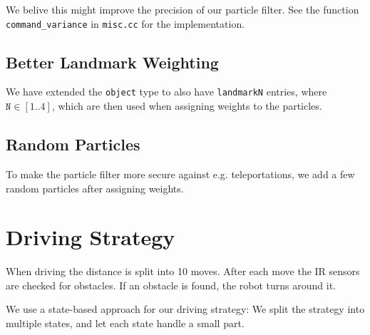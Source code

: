 \documentclass[a4paper,12pt]{article}
\begin{document}
We belive this might improve the precision of our particle filter.  See the
function \texttt{command_variance} in \texttt{misc.cc} for the implementation.


\subsection{Better Landmark Weighting}

We have extended the \texttt{object} type to also have \texttt{landmarkN}
entries, where $\texttt{N} \in [1..4]$, which are then used when assigning
weights to the particles.


\subsection{Random Particles}

To make the particle filter more secure against e.g. teleportations, we add a
few random particles after assigning weights.


\newpage
\section{Driving Strategy}

When driving the distance is split into 10 moves.  After each move the IR
sensors are checked for obstacles.  If an obstacle is found, the robot turns
around it.

We use a state-based approach for our driving strategy: We split the strategy
into multiple states, and let each state handle a small part.
\end{document}
